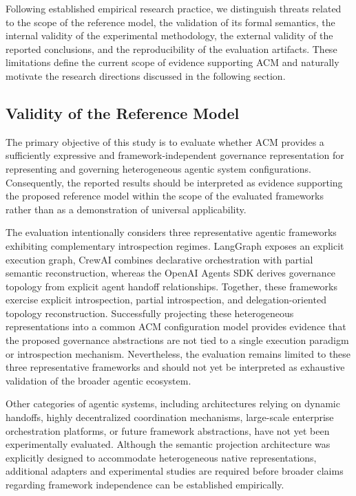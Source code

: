 \documentclass[10pt]{article}
\begin{document}
Following established empirical research practice, we distinguish threats related to the scope of the reference model, the validation of its formal semantics, the internal validity of the experimental methodology, the external validity of the reported conclusions, and the reproducibility of the evaluation artifacts. These limitations define the current scope of evidence supporting ACM and naturally motivate the research directions discussed in the following section.

\subsection{Validity of the Reference Model}
\label{sec:validity_reference_model}

The primary objective of this study is to evaluate whether ACM provides a sufficiently expressive and framework-independent governance representation for representing and governing heterogeneous agentic system configurations. Consequently, the reported results should be interpreted as evidence supporting the proposed reference model within the scope of the evaluated frameworks rather than as a demonstration of universal applicability.

The evaluation intentionally considers three representative agentic frameworks exhibiting complementary introspection regimes. LangGraph exposes an explicit execution graph, CrewAI combines declarative orchestration with partial semantic reconstruction, whereas the OpenAI Agents SDK derives governance topology from explicit agent handoff relationships. Together, these frameworks exercise explicit introspection, partial introspection, and delegation-oriented topology reconstruction. Successfully projecting these heterogeneous representations into a common ACM configuration model provides evidence that the proposed governance abstractions are not tied to a single execution paradigm or introspection mechanism. Nevertheless, the evaluation remains limited to these three representative frameworks and should not yet be interpreted as exhaustive validation of the broader agentic ecosystem.

Other categories of agentic systems, including architectures relying on dynamic handoffs, highly decentralized coordination mechanisms, large-scale enterprise orchestration platforms, or future framework abstractions, have not yet been experimentally evaluated. Although the semantic projection architecture was explicitly designed to accommodate heterogeneous native representations, additional adapters and experimental studies are required before broader claims regarding framework independence can be established empirically.
\end{document}
